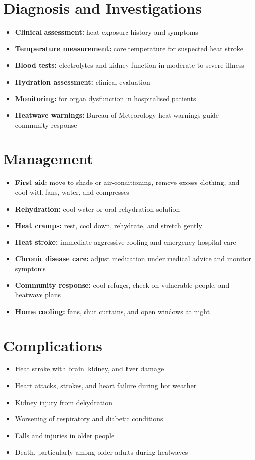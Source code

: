 \section*{Diagnosis and Investigations}
\begin{itemize}
    \item \textbf{Clinical assessment:} heat exposure history and symptoms
    \item \textbf{Temperature measurement:} core temperature for suspected heat stroke
    \item \textbf{Blood tests:} electrolytes and kidney function in moderate to severe illness
    \item \textbf{Hydration assessment:} clinical evaluation
    \item \textbf{Monitoring:} for organ dysfunction in hospitalised patients
    \item \textbf{Heatwave warnings:} Bureau of Meteorology heat warnings guide community response
\end{itemize}

\section*{Management}
\begin{itemize}
    \item \textbf{First aid:} move to shade or air-conditioning, remove excess clothing, and cool with fans, water, and compresses
    \item \textbf{Rehydration:} cool water or oral rehydration solution
    \item \textbf{Heat cramps:} rest, cool down, rehydrate, and stretch gently
    \item \textbf{Heat stroke:} immediate aggressive cooling and emergency hospital care
    \item \textbf{Chronic disease care:} adjust medication under medical advice and monitor symptoms
    \item \textbf{Community response:} cool refuges, check on vulnerable people, and heatwave plans
    \item \textbf{Home cooling:} fans, shut curtains, and open windows at night
\end{itemize}

\section*{Complications}
\begin{itemize}
    \item Heat stroke with brain, kidney, and liver damage
    \item Heart attacks, strokes, and heart failure during hot weather
    \item Kidney injury from dehydration
    \item Worsening of respiratory and diabetic conditions
    \item Falls and injuries in older people
    \item Death, particularly among older adults during heatwaves
\end{itemize}

